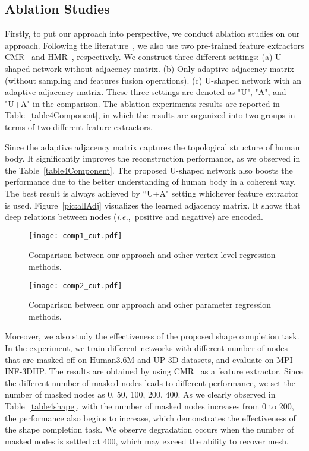 \documentclass[sigplan]{acmart}
\def\ie{\emph{i.e.}}
\begin{document}
\subsection{Ablation Studies}
\label{subsec:ablativeS}
Firstly, to put our approach into perspective, we conduct ablation studies on our approach. Following the literature~\cite{kocabas2019vibe}, we also use two pre-trained feature extractors CMR~\cite{kolotouros2019convolutional} and HMR~\cite{kanazawa2018end-to-end}, respectively. We construct three different settings: (a) U-shaped network without adjacency matrix. (b) Only adaptive adjacency matrix (without sampling and features fusion operations). (c) U-shaped network with an adaptive adjacency matrix. These three settings are denoted as "U", "A", and "U+A" in the comparison. The ablation experiments results are reported in Table~\ref{table4Component}, in which the results are organized into two groups in terms of two different feature extractors.

Since the adaptive adjacency matrix captures the topological structure of human body. It significantly improves the reconstruction performance, as we observed in the Table~\ref{table4Component}. The proposed U-shaped network also boosts the performance due to the better understanding of human body in a coherent way. The best result is always achieved by ``U+A" setting whichever feature extractor is used. Figure~\ref{pic:allAdj} visualizes the learned adjacency matrix. It shows that deep relations between nodes (\ie,~positive and negative) are encoded.

\begin{figure*}[]
\centering
\texttt{[image: comp1\_cut.pdf]}
\caption{Comparison between our approach and other vertex-level regression methods.} 
\label{pic:comp_free}
\end{figure*}
\begin{figure*}[]
\centering
\texttt{[image: comp2\_cut.pdf]}
\caption{Comparison between our approach and other parameter regression methods.
}
\label{pic:MLPCompare}
\end{figure*}
Moreover, we also study the effectiveness of the proposed shape completion task. In the experiment, we train different networks with different number of nodes that are masked off on Human3.6M and UP-3D datasets, and evaluate on MPI-INF-3DHP. The results are obtained by using  CMR~\cite{kolotouros2019convolutional} as a feature extractor. Since the different number of masked nodes leads to different performance, we set the number of masked nodes as 0, 50, 100, 200, 400. As we clearly observed in Table~\ref{table4shape}, with the number of masked nodes increases from 0 to 200, the performance also begins to increase, which demonstrates the effectiveness of the shape completion task. We observe degradation occurs when the number of masked nodes is settled at 400, which may exceed the ability to recover mesh. 
\end{document}

